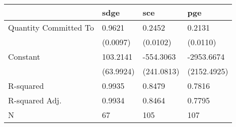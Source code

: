 \begin{tabular}{llll}
\hline
                      & sdge      & sce        & pge          \\
\hline
Quantity Committed To & 0.9621    & 0.2452     & 0.2131       \\
                      & (0.0097)  & (0.0102)   & (0.0110)     \\
Constant              & 103.2141  & -554.3063  & -2953.6674   \\
                      & (63.9924) & (241.0813) & (2152.4925)  \\
R-squared             & 0.9935    & 0.8479     & 0.7816       \\
R-squared Adj.        & 0.9934    & 0.8464     & 0.7795       \\
N                     & 67        & 105        & 107          \\
\hline
\end{tabular}